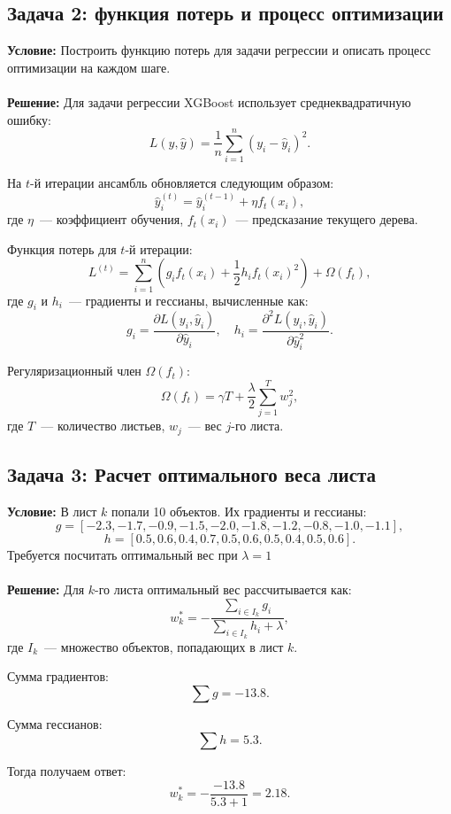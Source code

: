 \subsection*{Задача 2: функция потерь и процесс оптимизации}
\textbf{Условие:} Построить функцию потерь для задачи регрессии и описать процесс оптимизации на каждом шаге.
\\
\\
\textbf{Решение:} Для задачи регрессии XGBoost использует среднеквадратичную ошибку:
\[
L(y, \hat{y}) = \frac{1}{n} \sum_{i=1}^n (y_i - \hat{y}_i)^2.
\]

На $t$-й итерации ансамбль обновляется следующим образом:
\[
\hat{y}_i^{(t)} = \hat{y}_i^{(t-1)} + \eta f_t(x_i),
\]
где $\eta$~--- коэффициент обучения, $f_t(x_i)$~--- предсказание текущего дерева.

Функция потерь для $t$-й итерации:
\[
L^{(t)} = \sum_{i=1}^n \left( g_i f_t(x_i) + \frac{1}{2} h_i f_t(x_i)^2 \right) + \Omega(f_t),
\]
где $g_i$ и $h_i$~--- градиенты и гессианы, вычисленные как:
\[
g_i = \frac{\partial L(y_i, \hat{y}_i)}{\partial \hat{y}_i}, \quad h_i = \frac{\partial^2 L(y_i, \hat{y}_i)}{\partial \hat{y}_i^2}.
\]

Регуляризационный член $\Omega(f_t)$:
\[
\Omega(f_t) = \gamma T + \frac{\lambda}{2} \sum_{j=1}^T w_j^2,
\]
где $T$~--- количество листьев, $w_j$~--- вес $j$-го листа.

\subsection*{Задача 3: Расчет оптимального веса листа}
\textbf{Условие:} В лист $k$ попали 10 объектов. Их градиенты и гессианы:
\[
g = [-2.3, -1.7, -0.9, -1.5, -2.0, -1.8, -1.2, -0.8, -1.0, -1.1],
\]
\[
h = [0.5, 0.6, 0.4, 0.7, 0.5, 0.6, 0.5, 0.4, 0.5, 0.6].
\]
Требуется посчитать оптимальный вес при $\lambda = 1$
\\
\\
\textbf{Решение:} Для $k$-го листа оптимальный вес рассчитывается как:
\[
w_k^* = -\frac{\sum_{i \in I_k} g_i}{\sum_{i \in I_k} h_i + \lambda},
\]
где $I_k$~--- множество объектов, попадающих в лист $k$.

Сумма градиентов:
\[
\sum g = -13.8.
\]

Сумма гессианов:
\[
\sum h = 5.3.
\]

Тогда получаем ответ:
\[
w_k^* = -\frac{-13.8}{5.3 + 1} = 2.18.
\]
